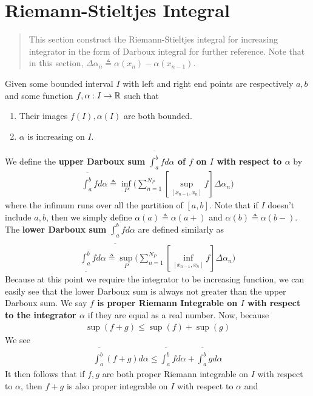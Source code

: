 \documentclass{report}
\begin{document}
\section{Riemann-Stieltjes Integral}
\begin{abstract}
This section construct the Riemann-Stieltjes integral for increasing integrator in the form of Darboux integral for further reference. Note that in this section, $\Delta \alpha _n\triangleq \alpha (x_n)-\alpha (x_{n-1})$. 
\end{abstract}
\begin{mdframed}
Given some bounded interval $I$ with left and right end points are respectively $a,b$ and some function $f,\alpha :I\rightarrow \mathbb{R}$ such that 
\begin{enumerate}[label=(\alph*)]
  \item Their images $f(I),\alpha (I)$ are both bounded. 
  \item $\alpha $ is increasing on $I$. 
\end{enumerate}
We define the \textbf{upper Darboux sum $\overline{\int_a^b}fd\alpha$ of $f$ on $I$ with respect to $\alpha $} by 
\begin{align*}
\overline{\int_a^b}fd\alpha \triangleq  \inf_P \Big(\sum_{n=1}^{N_P} [\sup_{[x_{n-1},x_n]} f] \Delta \alpha _n \Big)
\end{align*}
where the infimum runs over all the partition of $[a,b]$. Note that if $I$ doesn't include $a,b$, then we simply define  $\alpha (a)\triangleq \alpha (a+)$ and $\alpha (b)\triangleq \alpha (b-)$. The \textbf{lower Darboux sum} $\underline{\int_a^b}fd\alpha $ are defined similarly as 
\begin{align*}
\underline{\int_a^b}fd\alpha \triangleq  \sup_P \Big(\sum_{n=1}^{N_P} [\inf_{[x_{n-1},x_n]} f] \Delta \alpha _n \Big)
\end{align*}
Because at this point we require the integrator to be increasing function, we can easily see that the lower Darboux sum is always not greater than the upper Darboux sum. We say \textbf{$f$ is proper Riemann Integrable on $I$ with respect to the integrator $\alpha $} if they are equal as a real number. Now, because 
\begin{align*}
\sup(f+g)\leq \sup (f)+\sup (g) 
\end{align*}
We see 
\begin{align*}
\overline{\int_a^b}(f+g)d\alpha  \leq \overline{\int_a^b}fd\alpha + \overline{\int_a^b}gd\alpha 
\end{align*}
It then follows that if $f,g$ are both proper Riemann integrable on  $I$ with respect to  $\alpha $, then $f+g$ is also proper integrable on $I$ with respect to $\alpha $ and 

\end{mdframed}
\end{document}
